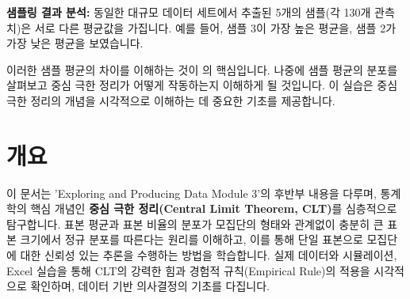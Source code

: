 \documentclass[11pt,a4paper]{article}
\begin{document}
\begin{tcolorbox}[summarybox]
\textbf{샘플링 결과 분석:}
동일한 대규모 데이터 세트에서 추출된 5개의 샘플(각 130개 관측치)은 서로 다른 평균값을 가집니다. 예를 들어, 샘플 3이 가장 높은 평균을, 샘플 2가 가장 낮은 평균을 보였습니다.

이러한 샘플 평균의 차이를 이해하는 것이 의 핵심입니다. 나중에 샘플 평균의 분포를 살펴보고 중심 극한 정리가 어떻게 작동하는지 이해하게 될 것입니다. 이 실습은 중심 극한 정리의 개념을 시각적으로 이해하는 데 중요한 기초를 제공합니다.
\end{tcolorbox}

\newpage

\section*{개요}
\begin{summarybox}[문서 핵심 요약]
이 문서는 'Exploring and Producing Data Module 3'의 후반부 내용을 다루며,
통계학의 핵심 개념인 \textbf{중심 극한 정리(Central Limit Theorem, CLT)}를 심층적으로 탐구합니다.
표본 평균과 표본 비율의 분포가 모집단의 형태와 관계없이 충분히 큰 표본 크기에서 정규 분포를 따른다는 원리를 이해하고,
이를 통해 단일 표본으로 모집단에 대한 신뢰성 있는 추론을 수행하는 방법을 학습합니다.
실제 데이터와 시뮬레이션, Excel 실습을 통해 CLT의 강력한 힘과 경험적 규칙(Empirical Rule)의 적용을 시각적으로 확인하며,
데이터 기반 의사결정의 기초를 다집니다.
\end{summarybox}

\newpage
\end{document}
